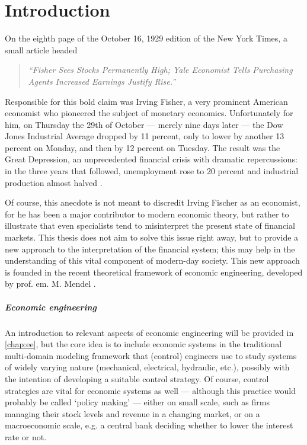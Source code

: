 \chapter{Introduction}
\label{chap:intro}
On the eighth page of the October 16, 1929 edition of the New York Times, a small article headed \cite{NYT1929}
\begin{quote}
    \emph{``Fisher Sees Stocks Permanently High; Yale Economist Tells Purchasing Agents Increased Earnings Justify Rise.''} 
\end{quote}
Responsible for this bold claim was Irving Fisher, a very prominent American economist who pioneered  the subject of monetary economics. Unfortunately for him, on Thursday the 29th of October --- merely nine days later --- the Dow Jones Industrial Average dropped by 11 percent, only to lower by another 13 percent on Monday, and then by 12 percent on Tuesday. The result was the Great Depression, an unprecedented financial crisis with dramatic repercussions: in the three years that followed, unemployment rose to 20 percent and industrial production almost halved \cite{gdepression}. 

Of course, this anecdote is not meant to discredit Irving Fischer as an economist, for he has been a major contributor to modern economic theory, but rather to illustrate that even specialists tend to misinterpret the present state of financial markets. This thesis does not aim to solve this issue right away, but to provide a new approach to the interpretation of the financial system; this may help in the understanding of this vital component of modern-day society. This new approach is founded in the recent theoretical framework of economic engineering, developed by prof. em. M. Mendel \cite{Mendel2019}. 

\paragraph{Economic engineering} An introduction to relevant aspects of economic engineering will be provided in \cref{chap:ee}, but the core idea is to include economic systems in the traditional multi-domain modeling framework that (control) engineers use to study systems of widely varying nature (mechanical, electrical, hydraulic, etc.), possibly with the intention of developing a suitable control strategy. Of course, control strategies are vital for economic systems as well --- although this practice would probably be called `policy making' --- either on small scale, such as firms managing their stock levels and revenue in a changing market, or on a macroeconomic scale, e.g. a central bank deciding whether to lower the interest rate or not.

